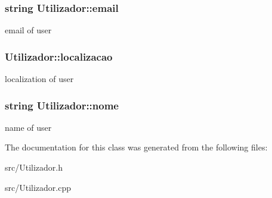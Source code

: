 \subsubsection[{email}]{\setlength{\rightskip}{0pt plus 5cm}string Utilizador\+::email\hspace{0.3cm}{\ttfamily [private]}}\label{class_utilizador_acbfe7f9a279131a567de9c85f00df332}
email of user \hypertarget{class_utilizador_a0bd3436ff45c7f80236d591f750c5522}{}
\subsubsection[{localizacao}]{ Utilizador\+::localizacao\hspace{0.3cm}{\ttfamily [private]}}\label{class_utilizador_a0bd3436ff45c7f80236d591f750c5522}
localization of user \hypertarget{class_utilizador_a3d22333263aef7b7a61a96b46ba7828d}{}
\subsubsection[{nome}]{\setlength{\rightskip}{0pt plus 5cm}string Utilizador\+::nome\hspace{0.3cm}{\ttfamily [private]}}\label{class_utilizador_a3d22333263aef7b7a61a96b46ba7828d}
name of user 

The documentation for this class was generated from the following files\+:\begin{DoxyCompactItemize}
\item 
src/Utilizador.\+h\item 
src/Utilizador.\+cpp\end{DoxyCompactItemize}
